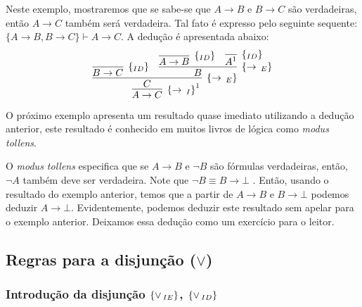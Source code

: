 \begin{Example}
Neste exemplo, mostraremos que se sabe-se que $A \to B$ e $B \to C$
s\~ao verdadeiras, ent\~ao $A \to C$ tamb\'em ser\'a verdadeira. Tal
fato \'e expresso pelo seguinte sequente: $\{A\to B,B\to C\}\vdash A
\to C$. A dedu\c{c}\~ao \'e apresentada abaixo:
\[
     \infer[\impI^1]
              {A \to C}
              {
                \infer[\impE]
                         {C}
                         {
                           \infer[\Id]{B\to C}{} &
                           \infer[\impE]
                                    {B}
                                    {
                                      \infer[\Id]{A\to B}{} &
                                      \infer[\Id]{A^1}{}
                                    }
                         }
              }
\]
\end{Example}
O pr\'oximo exemplo apresenta um resultado quase imediato utilizando a
dedu\c{c}\~ao anterior, este resultado \'e conhecido em muitos livros
de l\'ogica como \textit{modus tollens}.
\begin{Example}
O \textit{modus tollens} especifica que se $A\to B$ e $\neg B$ s\~ao
f\'ormulas verdadeiras, ent\~ao, $\neg A$ tamb\'em deve ser
verdadeira. Note que $\neg B \equiv B\to \bot$ . Ent\~ao, usando o
resultado do exemplo anterior, temos que
a partir de $A\to B$ e $B \to \bot$ podemos deduzir $A \to \bot$.
Evidentemente, podemos deduzir este resultado sem apelar para o
exemplo anterior. Deixamos essa dedu\c{c}\~ao como um exerc\'icio para
o leitor.
\end{Example}

\subsection{Regras para a disjun\c{c}\~ao ($\lor$)}

\subsubsection{Introdu\c{c}\~ao da disjun\c{c}\~ao $\scriptsize{\{\lor\,_{IE}\}}$, $\scriptsize{\{\lor\,_{ID}\}}$}

